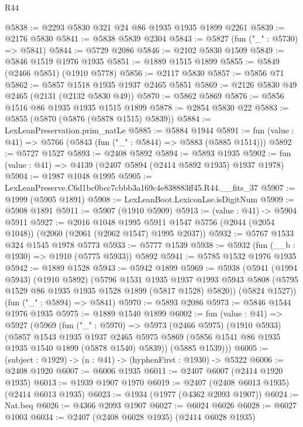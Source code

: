 \begin{lexlean}{R44}
\begin{coremodule}
@5838 := @2293 @5830 @321 @24 @86 @1935 @1935 @1899 @2261
@5839 := @2176 @5830
@5841 := @5838 @5839 @2304
@5843 := @5827 (fun ("_" : @5730) => @5841)
@5844 := @5729 @2086
@5846 := @2102 @5830 @1509
@5849 := @5846 @1519 @1976 @1935
@5851 := @1889 @1515 @1899
@5855 := @5849 (@2466 @5851) (@1910 @5778)
@5856 := @2117 @5830
@5857 := @5856 @71
@5862 := @5857 @1518 @1935 @1937 @2465 @5851
@5869 := @2126 @5830 @49 @2465 (@2131 (@2132 @5830 @49))
@5870 := @5862 @5869
@5876 := @5856 @1516 @86 @1935 @1935 @1515 @1899
@5878 := @2854 @5830 @22
@5883 := @5855 (@5870 (@5876 (@5878 @1515) @5839))
@5884 := LexLeanPreservation.prim_natLe
@5885 := @5884 @1944
@5891 := fun (value : @41) => @5766 (@5843 (fun ("_" : @5844) => @5883 (@5885 @1514)))
@5892 := @5727 @1527
@5893 := @2408 @5892
@5894 := @5893 @1935
@5902 := fun (value : @41) => @4139 (@2407 @5894 (@2414 @5892 @1935) @1937 @1978)
@5904 := @1987 @1048 @1995
@5905 := LexLeanPreserve.C6d1bc0bcc7cbbb3a169c4e838883ff45.R44.__fits_37
@5907 := @1999 (@5905 @1891)
@5908 := LexLeanBoot.LexiconLse.isDigitNum
@5909 := @5908 @1891
@5911 := @5907 (@1910 @5909)
@5913 := (value : @41) -> @5904 @5911
@5927 := @2016
    @1048
    @1995
    @5911
    @1547
    @5756
    (@2044 (@2054 @1048))
    (@2060 (@2061 (@2062 @1547) @1995 @2037))
@5932 := @5767 @1533 @324 @1545 @1978 @5773
@5933 := @5777 @1539
@5938 := @5932 (fun (__b : @1930) => @1910 (@5775 @5933)) @5892
@5941 := @5785 @1532 @1976 @1935
@5942 := @1889 @1528
@5943 := @5942 @1899
@5969 := @5938
    (@5941
      (@1994 @5943)
      (@1910 @5892)
      (@5796
        @1531
        @1935
        @1937
        @1993
        @5943
        @5808
        (@5795 @1529 @86 @1935 @1935 @1528 @1899 (@5817 @1528) @5820))
      (@5824 @1527))
    (fun ("_" : @5894) => @5841)
@5970 := @5893 @2086
@5973 := @5846 @1544 @1976 @1935
@5975 := @1889 @1540 @1899
@6002 := fun (value : @41) =>
  @5927
    (@5969
      (fun ("_" : @5970) =>
      @5973
        (@2466 @5975)
        (@1910 @5933)
        (@5857
          @1543
          @1935
          @1937
          @2465
          @5975
          @5869
          (@5856 @1541 @86 @1935 @1935 @1540 @1899 (@5878 @1540) @5839))
        (@5885 @1539)))
@6005 := (subject : @1929) -> (n : @41) -> (hyphenFirst : @1930) -> @5322
@6006 := @2408 @1920
@6007 := @6006 @1935
@6011 := @2407 @6007 (@2414 @1920 @1935)
@6013 := @1939 @1907 @1970
@6019 := @2407 (@2408 @6013 @1935) (@2414 @6013 @1935)
@6023 := @1934 (@1977 (@4362 @2093 @1907))
@6024 := Nat.beq
@6026 := @4366 @2093 @1907
@6027 := @6024 @6026
@6028 := @6027 @1003
@6034 := @2407 (@2408 @6028 @1935) (@2414 @6028 @1935)

\end{coremodule}
\end{lexlean}
